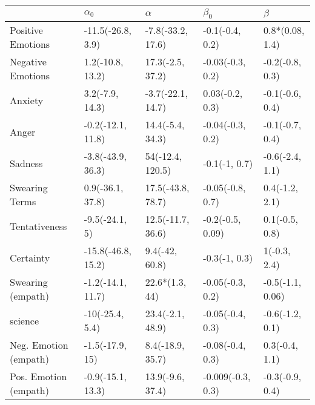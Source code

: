 \begin{tabular}{lllll}
\toprule
{} &          $\alpha_0$ &           $\alpha$ &          $\beta_0$ &           $\beta$ \\
\midrule
Positive Emotions     &   -11.5(-26.8, 3.9) &  -7.8(-33.2, 17.6) &    -0.1(-0.4, 0.2) &   0.8*(0.08, 1.4) \\
Negative Emotions     &    1.2(-10.8, 13.2) &   17.3(-2.5, 37.2) &   -0.03(-0.3, 0.2) &   -0.2(-0.8, 0.3) \\
Anxiety               &     3.2(-7.9, 14.3) &  -3.7(-22.1, 14.7) &    0.03(-0.2, 0.3) &   -0.1(-0.6, 0.4) \\
Anger                 &   -0.2(-12.1, 11.8) &   14.4(-5.4, 34.3) &   -0.04(-0.3, 0.2) &   -0.1(-0.7, 0.4) \\
Sadness               &   -3.8(-43.9, 36.3) &   54(-12.4, 120.5) &      -0.1(-1, 0.7) &   -0.6(-2.4, 1.1) \\
Swearing Terms        &    0.9(-36.1, 37.8) &  17.5(-43.8, 78.7) &   -0.05(-0.8, 0.7) &    0.4(-1.2, 2.1) \\
Tentativeness         &      -9.5(-24.1, 5) &  12.5(-11.7, 36.6) &   -0.2(-0.5, 0.09) &    0.1(-0.5, 0.8) \\
Certainty             &  -15.8(-46.8, 15.2) &     9.4(-42, 60.8) &      -0.3(-1, 0.3) &      1(-0.3, 2.4) \\
Swearing (empath)     &   -1.2(-14.1, 11.7) &     22.6*(1.3, 44) &   -0.05(-0.3, 0.2) &  -0.5(-1.1, 0.06) \\
science               &     -10(-25.4, 5.4) &   23.4(-2.1, 48.9) &   -0.05(-0.4, 0.3) &   -0.6(-1.2, 0.1) \\
Neg. Emotion (empath) &     -1.5(-17.9, 15) &   8.4(-18.9, 35.7) &   -0.08(-0.4, 0.3) &    0.3(-0.4, 1.1) \\
Pos. Emotion (empath) &   -0.9(-15.1, 13.3) &   13.9(-9.6, 37.4) &  -0.009(-0.3, 0.3) &   -0.3(-0.9, 0.4) \\
\bottomrule
\end{tabular}
